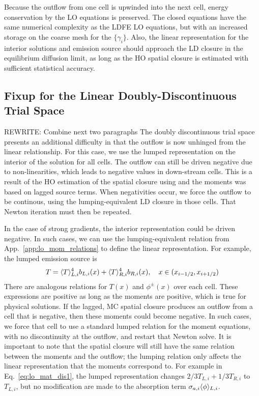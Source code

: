 Because the
outflow from one cell is upwinded into the next cell, energy conservation by the LO
equations is preserved.
The closed equations have the
same numerical complexity as the LDFE LO equations, but with an increased storage on the
coarse mesh for the
$\{\gamma_i\}$.  Also, the linear representation for the interior
solutions and emission source should approach the LD closure in the equilibrium diffusion limit, as long
as the HO spatial closure is estimated with sufficient statistical accuracy.  


\subsection{Fixup for the Linear Doubly-Discontinuous Trial Space}

REWRITE: Combine next two paragraphs
The doubly discontinuous trial space presents an additional difficulty in that the outflow
is now unhinged from the linear relationship.  For this case, we use the lumped
representation on the interior of the solution for all cells. The outflow can still be driven negative
due to non-linearities, which leads to negative values in down-stream cells. 
This is a result of the HO estimation of the spatial closure using
and the moments was based on lagged source terms.  When negativities occur, we force the
outflow to be continous, using the lumping-equivalent LD closure in those cells.  That
Newton iteration must then be repeated.

In the case of strong gradients, the interior representation could be driven
negative.  In such cases, we can use the lumping-equivalent relation from
App.~\ref{app:lo_mom_relations} to define the linear representation.  For
example, the lumped emission source is
\begin{equation}
    T = \langle T \rangle_{L,i}^4 b_{L,i}(x) + \langle T \rangle_{R,i}^4 b_{R,i}(x) , \quad x\in({x_{i-1/2}},{x_{i+1/2}})
\end{equation}
There are analogous relations for $T(x)$ and $\phi^\pm(x)$ over each cell.
These expressions are positive as long as the moments are positive, which is true for
physical solutions.  If the lagged, MC spatial closure produces an outflow from a cell that is
negative, then these moments could become negative.  In such cases, we force that cell to
use a standard lumped relation for the moment equations, with no discontinuity at the
outflow, and restart that Newton solve.  It is important to note that the spatial closure will still have the same
relation between the moments and the outflow; the lumping relation only affects the
linear representation that the moments correspond to.  For example in
Eq.~\eqref{eq:lo_mat_dis1}, the lumped representation changes $2/3
T_{L,i} + 1/3 T_{R,i}$ to $T_{L,i}$, but no modification are made to the
absorption term $\sigma_{a,i}\langle \phi \rangle_{L,i}$.

